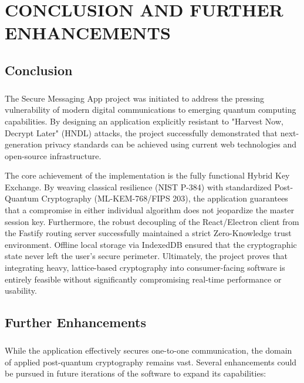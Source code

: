 \chapter{\MakeUppercase{Conclusion and Further enhancements}}

\section{Conclusion}
\paragraph{}
The Secure Messaging App project was initiated to address the pressing vulnerability of modern digital communications to emerging quantum computing capabilities. By designing an application explicitly resistant to "Harvest Now, Decrypt Later" (HNDL) attacks, the project successfully demonstrated that next-generation privacy standards can be achieved using current web technologies and open-source infrastructure.

The core achievement of the implementation is the fully functional Hybrid Key Exchange. By weaving classical resilience (NIST P-384) with standardized Post-Quantum Cryptography (ML-KEM-768/FIPS 203), the application guarantees that a compromise in either individual algorithm does not jeopardize the master session key. Furthermore, the robust decoupling of the React/Electron client from the Fastify routing server successfully maintained a strict Zero-Knowledge trust environment. Offline local storage via IndexedDB ensured that the cryptographic state never left the user's secure perimeter. Ultimately, the project proves that integrating heavy, lattice-based cryptography into consumer-facing software is entirely feasible without significantly compromising real-time performance or usability.

\section{Further Enhancements}
\paragraph{}
While the application effectively secures one-to-one communication, the domain of applied post-quantum cryptography remains vast. Several enhancements could be pursued in future iterations of the software to expand its capabilities:

